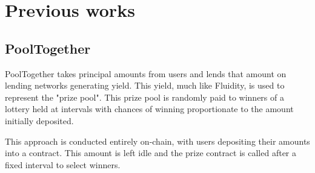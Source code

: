
\textit{}\section{Previous works}

\subsection{PoolTogether \cite{pool}}

PoolTogether takes principal amounts from users and lends that amount on lending networks generating yield. This yield, much like Fluidity, is used to represent the "prize pool". This prize pool is randomly paid to winners of a lottery held at intervals with chances of winning proportionate to the amount initially deposited.

This approach is conducted entirely on-chain, with users depositing their amounts into a contract. This amount is left idle and the prize contract is called after a fixed interval to select winners.
